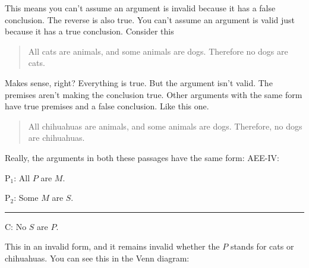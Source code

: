 This means you can't assume an argument is invalid because it has a false conclusion. The reverse is also true. You can't assume an argument is valid just because it has a true conclusion. Consider this 

\begin{quotation}  All cats are animals, and some animals are dogs. Therefore no dogs are cats. \end{quotation}

Makes sense, right? Everything is true. But the argument isn't valid. The premises aren't making the conclusion true. Other arguments with the same form have true premises and a false conclusion. Like this one.

\begin{quotation}All chihuahuas are animals, and some animals are dogs. Therefore, no dogs are chihuahuas.\end{quotation}

Really, the arguments in both these passages have the same form: AEE-IV: 

\begin{earg}
\item[P$_1$:] All $P$ are $M$.
\item[P$_2$:] Some $M$ are $S$.
\vspace{-.5em}
\item [] \rule{0.2\linewidth}{.5pt} 
\item[C:] No $S$ are $P$.
\end{earg} 

This in an invalid form, and it remains invalid whether the $P$ stands for cats or chihuahuas. You can see this in the Venn diagram:

\begin{center}
\end{center}

